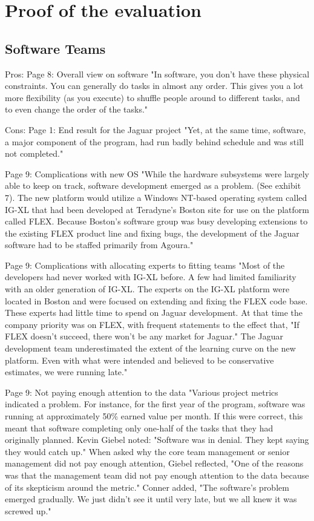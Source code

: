 \section{Proof of the evaluation}

\subsection{Software Teams}

Pros:
Page 8:
Overall view on software
"In software, you don't have these physical constraints. You can generally do tasks in almost any order. This gives you a lot more flexibility (as you execute) to shuffle people around to different tasks, and to even change the order of the tasks."

Cons:
Page 1:
End result for the Jaguar project
"Yet, at the same time, software, a major component of the program, had run badly behind schedule and was still not completed."

Page 9:
Complications with new OS
"While the hardware subsystems were largely able to keep on track, software development emerged as a problem. (See exhibit 7).
The new platform would utilize a Windows NT-based operating system called IG-XL that had been developed at Teradyne's Boston site for use on the platform called FLEX. Because Boston's software group was busy developing extensions to the existing FLEX product line and fixing bugs, the development of the Jaguar software had to be staffed primarily from Agoura."

Page 9:
Complications with allocating experts to fitting teams
"Most of the developers had never worked with IG-XL before. A few had limited familiarity with an older generation of IG-XL. The experts on the IG-XL platform were located in Boston and were focused on extending and fixing the FLEX code base. These experts had little time to spend on Jaguar development. At that time the company priority was on FLEX, with frequent statements to the effect that, "If FLEX doesn't succeed, there won't be any market for Jaguar." The Jaguar development team underestimated the extent of the learning curve on the new platform. Even with what were intended and believed to be conservative estimates, we were running late."

Page 9:
Not paying enough attention to the data
"Various project metrics indicated a problem. For instance, for the first year of the program, software was running at approximately 50\% earned value per month. If this were correct, this meant that software completing only one-half of the tasks that they had originally planned. Kevin Giebel noted: "Software was in denial. They kept saying they would catch up." When asked why the core team management or senior management did not pay enough attention, Giebel reflected, "One of the reasons was that the management team did not pay enough attention to the data because of its skepticism around the metric." Conner added, "The software's problem emerged gradually. We just didn't see it until very late, but we all knew it was screwed up."

